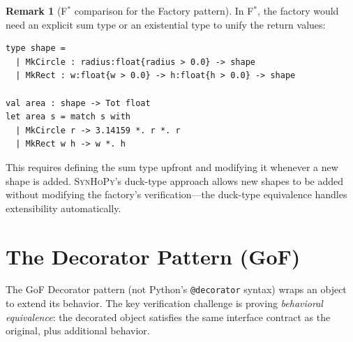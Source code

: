 \documentclass[11pt,a4paper]{report}
\theoremstyle{definition}
\newtheorem{remark}[definition]{Remark}
\theoremstyle{plain}
\newcommand{\fstar}{F$^{*}$}
\newcommand{\synhopy}{\textsc{SynHoPy}}
\begin{document}
\begin{remark}[\fstar{} comparison for the Factory pattern]
In \fstar{}, the factory would need an explicit sum type or
an existential type to unify the return values:
\begin{lstlisting}[style=fstar]
type shape =
  | MkCircle : radius:float{radius > 0.0} -> shape
  | MkRect : w:float{w > 0.0} -> h:float{h > 0.0} -> shape

val area : shape -> Tot float
let area s = match s with
  | MkCircle r -> 3.14159 *. r *. r
  | MkRect w h -> w *. h
\end{lstlisting}
This requires defining the sum type upfront and modifying it whenever
a new shape is added.  \synhopy{}'s duck-type approach allows new
shapes to be added without modifying the factory's verification---the
duck-type equivalence handles extensibility automatically.
\end{remark}

\section{The Decorator Pattern (GoF)}

The GoF Decorator pattern (not Python's \lstinline[style=python]{@decorator}
syntax) wraps an object to extend its behavior.  The key verification
challenge is proving \emph{behavioral equivalence}: the decorated object
satisfies the same interface contract as the original, plus additional
behavior.
\end{document}
